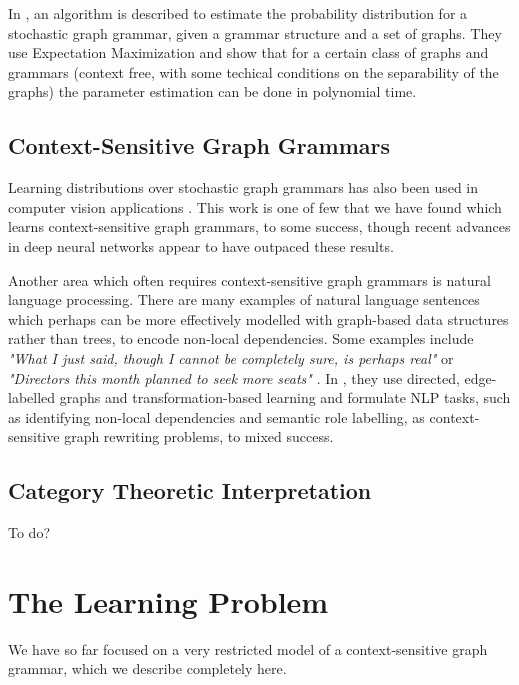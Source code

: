 \documentclass[]{article}
\begin{document}
In \cite{oates2003estimating}, an algorithm is described to estimate the
probability distribution for a stochastic graph grammar, given a grammar
structure and a set of graphs. They use Expectation Maximization and show that
for a certain class of graphs and grammars (context free, with some techical
conditions on the separability of the graphs) the parameter estimation can be
done in polynomial time.

\subsection{Context-Sensitive Graph Grammars}

Learning distributions over stochastic graph grammars has also been used in
computer vision applications \cite{zhu2007stochastic}. This work is one of few
that we have found which learns context-sensitive graph grammars, to some
success, though recent advances in deep neural networks appear to have outpaced
these results.

Another area which often requires context-sensitive graph grammars is natural
language processing. There are many examples of natural language sentences which
perhaps can be more effectively modelled with graph-based data structures
rather than trees, to encode non-local dependencies. Some examples include
\emph{"What I just said, though I cannot be completely sure, is perhaps real"}
\cite{zhu2007stochastic} or \emph{"Directors this month planned to seek more
seats"} \cite{jijkoun2007learning}. In \cite{jijkoun2007learning}, they use
directed, edge-labelled graphs and transformation-based learning and formulate
NLP tasks, such as identifying non-local dependencies and semantic role
labelling, as context-sensitive graph rewriting problems, to mixed success.

\subsection{Category Theoretic Interpretation}

To do?




\section{The Learning Problem}\label{the-learning-problem}

We have so far focused on a very restricted model of a context-sensitive graph
grammar, which we describe completely here.
\end{document}
